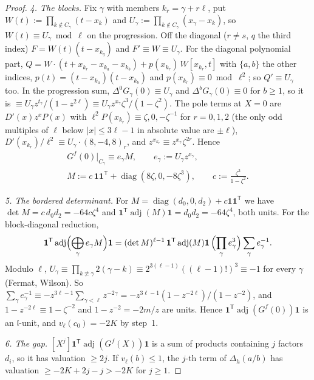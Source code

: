 \documentclass[11pt]{amsart}
\theoremstyle{definition}
\theoremstyle{remark}
\numberwithin{equation}{section}
\newcommand{\fl}{\mathfrak{l}}
\newcommand{\one}{\mathbf{1}}
\newcommand{\adj}{\operatorname{adj}}
\begin{document}
\begin{proof}
\emph{4. The blocks.} Fix $\gamma$ with members $k_r=\gamma+r\ell$, put $W(t):=\prod_{k\notin C_\gamma}(t-x_k)$ and
$U_\gamma:=\prod_{k\notin C_\gamma}(x_\gamma-x_k)$, so $W(t)\equiv U_\gamma\bmod\ell$ on the progression. Off the diagonal
($r\ne s$, $q$ the third index) $F=W(t)(t-x_{k_q})$ and $F'\equiv W\equiv U_\gamma$. For the diagonal polynomial part,
$Q=W\cdot(t+x_{k_r}-x_{k_a}-x_{k_b})+p(x_{k_r})\,W[x_{k_r},t]$ with $\{a,b\}$ the other indices, $p(t)=(t-x_{k_a})(t-x_{k_b})$ and
$p(x_{k_r})\equiv0\bmod\ell^2$; so $Q'\equiv U_\gamma$ too. In the progression sum, $\Delta^0G_\gamma(0)\equiv U_\gamma$ and
$\Delta^bG_\gamma(0)\equiv0$ for $b\ge1$, so it is $\equiv U_\gamma z^{t_\gamma}/(1-z^{2\ell})\equiv U_\gamma z^{x_\gamma}\zeta^3/(1-\zeta^2)$.
The pole terms at $X=0$ are $D'(x)z^xP(x)$ with $\ell^2P(x_{k_r})\equiv\zeta,0,-\zeta^{-1}$ for $r=0,1,2$ (the only odd
multiples of $\ell$ below $|x|\le3\ell-1$ in absolute value are $\pm\ell$), $D'(x_{k_r})/\ell^2\equiv U_\gamma\cdot(8,-4,8)_r$,
and $z^{x_{k_r}}\equiv z^{x_\gamma}\zeta^{2r}$. Hence
\begin{gather*}
  G^f(0)|_{C_\gamma}\equiv e_\gamma M,\qquad e_\gamma:=U_\gamma z^{x_\gamma},\\
  M:=c\,\one\one^{\mathsf T}+\operatorname{diag}(8\zeta,0,-8\zeta^3),\qquad c:=\frac{\zeta^3}{1-\zeta^2}.
\end{gather*}

\emph{5. The bordered determinant.} For $M=\operatorname{diag}(d_0,0,d_2)+c\one\one^{\mathsf T}$ we have
$\det M=c\,d_0d_2=-64c\zeta^4$ and $\one^{\mathsf T}\adj(M)\one=d_0d_2=-64\zeta^4$, both units. For the block-diagonal
reduction,
\[
  \one^{\mathsf T}\adj\Bigl(\bigoplus_\gamma e_\gamma M\Bigr)\one=(\det M)^{\ell-1}\,\one^{\mathsf T}\adj(M)\one\,
  \Bigl(\prod_\gamma e_\gamma^3\Bigr)\sum_\gamma e_\gamma^{-1}.
\]
Modulo $\ell$, $U_\gamma\equiv\prod_{k\not\equiv\gamma}2(\gamma-k)\equiv2^{3(\ell-1)}((\ell-1)!)^3\equiv-1$ for every $\gamma$
(Fermat, Wilson). So $\sum_\gamma e_\gamma^{-1}\equiv-z^{3\ell-1}\sum_{\gamma<\ell}z^{-2\gamma}=-z^{3\ell-1}(1-z^{-2\ell})/(1-z^{-2})$, and
$1-z^{-2\ell}\equiv1-\zeta^{-2}$ and $1-z^{-2}=-2m/z$ are units. Hence $\one^{\mathsf T}\adj(G^f(0))\one$ is an $\fl$-unit, and
$v_\ell(c_0)=-2K$ by step~1.

\emph{6. The gap.} $[X^j]\one^{\mathsf T}\adj(G^f(X))\one$ is a sum of products containing $j$ factors $d_i$, so it has
valuation $\ge2j$. If $v_\ell(b)\le1$, the $j$-th term of $\Delta_h(a/b)$ has valuation $\ge-2K+2j-j>-2K$ for $j\ge1$.
\end{proof}
\end{document}

